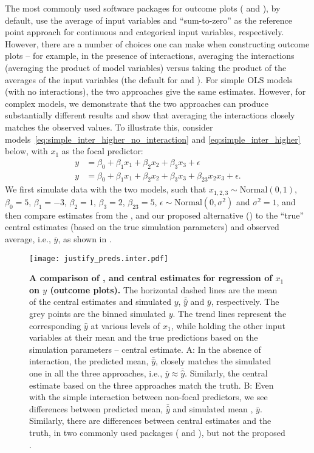 The most commonly used  software packages for outcome plots ( and ), by default, use the average of input variables and ``sum-to-zero'' as the reference point approach for continuous and categorical input variables, respectively. However, there are a number of choices one can make when constructing outcome plots -- for example, in the presence of interactions, averaging the interactions (averaging the product of model variables) versus taking the product of the averages of the input variables (the default for  and ). For simple OLS models (with no interactions), the two approaches give the same estimates. However, for complex models, we demonstrate that the two approaches can produce substantially different results and show that averaging the interactions closely matches the observed values. To illustrate this, consider models~\ref{eq:simple_inter_higher_no_interaction} and \ref{eq:simple_inter_higher} below, with $x_1$ as the focal predictor:
%
\begin{align}
y &= \beta_0 + \beta_1x_1 + \beta_2x_2 + \beta_3x_3 + \epsilon \label{eq:simple_inter_higher_no_interaction}\\
y &= \beta_0 + \beta_1x_1 + \beta_2x_2 + \beta_3x_3 + \beta_{23}x_2x_3 + \epsilon \label{eq:simple_inter_higher}.
\end{align}
%
We first simulate data with the two models, such that $x_{1,2,3} \sim \mathrm{Normal}(0, 1)$, $\beta_0 = 5$, $\beta_1 = -3$, $\beta_2 = 1$, $\beta_3 = 2$, $\beta_{23} = 5$, $\epsilon \sim \mathrm{Normal}(0, \sigma^2)$ and $\sigma^2 = 1$, and then compare estimates from the ,  and our proposed alternative () to the ``true'' central estimates (based on the true simulation parameters) and observed average, i.e., $\bar{y}$, as shown in .
%
\begin{figure}
\begin{center}
\texttt{[image: justify\_preds.inter.pdf]}
\end{center}
\caption{{\bf A comparison of ,  and  central estimates for regression of $x_1$ on $y$ (outcome plots).} The horizontal dashed lines are the mean of the central estimates and simulated $y$, $\bar{\hat{y}}$ and $\bar{y}$, respectively. The grey points are the binned simulated $y$. The trend lines represent the corresponding $\hat{y}$ at various levels of $x_1$, while holding the other input variables at their mean and the true predictions based on the simulation parameters -- central estimate. A: In the absence of interaction, the predicted mean, $\bar{\hat{y}}$, closely matches the simulated one in all the three approaches, i.e., $\bar{y} \approx \bar{\hat{y}}$. Similarly, the central estimate based on the three approaches match the truth. B: Even with the simple interaction between non-focal predictors, we see differences between predicted mean, $\bar{\hat{y}}$ and simulated mean , $\bar{y}$. Similarly, there are differences between central estimates and the truth, in two commonly used packages ( and ), but not the proposed .}
\label{fig:justify_plots}
\end{figure}
